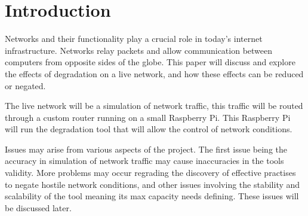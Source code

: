 \chapter{Introduction}
Networks and their functionality play a crucial role in today's internet infrastructure. Networks relay packets and allow communication between computers from opposite sides of the globe. This paper will discuss and explore the effects of degradation on a live network, and how these effects can be reduced or negated. 

The live network will be a simulation of network traffic, this traffic will be routed through a custom router running on a small Raspberry Pi. This Raspberry Pi will run the degradation tool that will allow the control of network conditions. 

Issues may arise from various aspects of the project. The first issue being the accuracy in simulation of network traffic may cause inaccuracies in the tools validity. More problems may occur regrading the discovery of effective practises to negate hostile network conditions, and other issues involving the stability and scalability of the tool meaning its max capacity needs defining. These issues will be discussed later.
